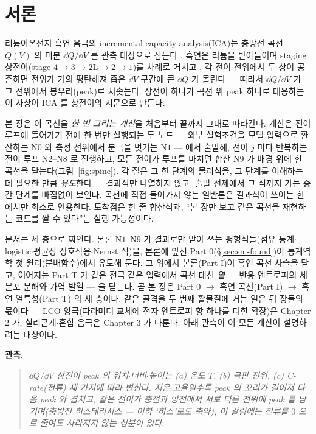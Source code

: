 \section*{서론}

리튬이온전지 흑연 음극의 incremental capacity analysis(ICA)는 충방전 곡선 $Q(V)$ 의 미분
$\dd Q/\dd V$ 를 관측 대상으로 삼는다 \cite{bloom2005,dubarry2012}. 흑연은 리튬을 받아들이며 staging
상전이(stage $4\!\to\!3\!\to\!2\mathrm L\!\to\!2\!\to\!1$)를 차례로 거치고 \cite{dahn1991,ohzuku1993}, 각 전이
전위에서 두 상이 공존하면 전위가 거의 평탄해져 좁은 $\dd V$ 구간에 큰 $\dd Q$ 가 몰린다 --- 따라서
$\dd Q/\dd V$ 가 그 전위에서 봉우리(peak)로 치솟는다. 상전이 하나가 곡선 위 peak 하나로 대응하는 이
사상이 ICA 를 상전이의 지문으로 만든다.

본 장은 이 곡선을 \emph{한 번 그리는 계산}을 처음부터 끝까지 그대로 따라간다. 계산은 전이 루프에 들어가기 전에
한 번만 실행되는 두 노드 --- 외부 실험조건을 모델 입력으로 환산하는 $\mathrm N0$ 와 측정 전위에서 분극을 벗기는
$\mathrm N1$ --- 에서 출발해, 전이 $j$ 마다 반복하는 전이 루프 $\mathrm N2$--$\mathrm N8$ 로 진행하고,
모든 전이가 루프를 마치면 합산 $\mathrm N9$ 가 배경 위에 한 곡선을 닫는다(그림~\ref{fig:spine}). 각 절은 그 한 단계의 물리식을, 그 단계를
이해하는 데 필요한 만큼 \emph{유도}한다 --- 결과식만 나열하지 않고, 출발 전제에서 그 식까지 가는 중간
단계를 빠짐없이 보인다. 곡선에 직접 들어가지 않는 일반론은 결과식이 쓰이는 한에서만 최소로 인용한다.
도착점은 한 줄 합산식과, ``본 장만 보고 같은 곡선을 재현하는 코드를 짤 수 있다''는 실행 가능성이다.

문서는 세 층으로 짜인다. 본론 $\mathrm N1$--$\mathrm N9$ 가 결과로만 받아 쓰는 평형식들(점유 통계$\cdot$
logistic$\cdot$평균장 상호작용$\cdot$Nernst 식)을, 본론에 앞선 Part 0(\S\ref{sec:sm-found})이 통계역학 첫
원리(분배함수)에서 유도해 둔다. 그 위에서 본론(Part I)이 흑연 곡선 사슬을 닫고, 이어지는 Part T 가 같은
전극$\cdot$같은 입력에서 곡선 대신 \emph{열} --- 반응 엔트로피의 세 분포 분해와 가역 발열 --- 을 닫는다.
곧 본 장은 Part 0 $\to$ 흑연 곡선(Part I) $\to$ 흑연 열특성(Part T) 의 세 층이다. 같은 골격을 두 번째
활물질에 거는 일은 뒤 장들의 몫이다 --- LCO 양극(파라미터 교체에 전자 엔트로피 항 하나를 더한 확장)은
Chapter 2 가, 실리콘계$\cdot$혼합 음극은 Chapter 3 가 다룬다. 아래 관측이 이 모든 계산이 설명하려는 대상이다.

\textbf{관측.}
\begin{quote}\itshape
$\dd Q/\dd V$ 상전이 peak 의 위치$\cdot$너비$\cdot$높이는 (a) 온도 $T$, (b) 극판 전위, (c) C-rate(전류)
세 가지에 따라 변한다. 저온$\cdot$고율일수록 peak 의 꼬리가 길어져 다음 peak 와 겹치고, 같은 전이가 충전과 방전에서
서로 다른 전위에 peak 를 남기며(충방전 히스테리시스 --- 이하 `히스'로도 축약), 이 갈림에는 전류를 $0$ 으로 줄여도 사라지지 않는 성분이 있다.
\end{quote}

